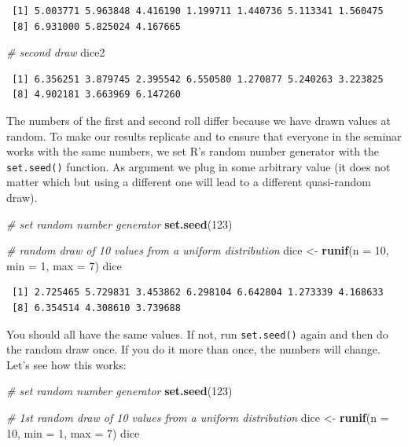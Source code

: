 \documentclass[]{article}
\newenvironment{Shaded}{\begin{snugshade}}{\end{snugshade}}
\newcommand{\CommentTok}[1]{\textcolor[rgb]{0.56,0.35,0.01}{\textit{#1}}}
\newcommand{\DataTypeTok}[1]{\textcolor[rgb]{0.13,0.29,0.53}{#1}}
\newcommand{\DecValTok}[1]{\textcolor[rgb]{0.00,0.00,0.81}{#1}}
\newcommand{\KeywordTok}[1]{\textcolor[rgb]{0.13,0.29,0.53}{\textbf{#1}}}
\newcommand{\NormalTok}[1]{#1}
\newcommand{\StringTok}[1]{\textcolor[rgb]{0.31,0.60,0.02}{#1}}
\begin{document}
\begin{verbatim}
 [1] 5.003771 5.963848 4.416190 1.199711 1.440736 5.113341 1.560475
 [8] 6.931000 5.825024 4.167665
\end{verbatim}

\begin{Shaded}
\begin{Highlighting}[]
\CommentTok{# second draw}
\NormalTok{dice2}
\end{Highlighting}
\end{Shaded}

\begin{verbatim}
 [1] 6.356251 3.879745 2.395542 6.550580 1.270877 5.240263 3.223825
 [8] 4.902181 3.663969 6.147260
\end{verbatim}

The numbers of the first and second roll differ because we have drawn values at random. To make our results replicate and to ensure that everyone in the seminar works with the same numbers, we set R's random number generator with the \texttt{set.seed()} function. As argument we plug in some arbitrary value (it does not matter which but using a different one will lead to a different quasi-random draw).

\begin{Shaded}
\begin{Highlighting}[]
\CommentTok{# set random number generator}
\KeywordTok{set.seed}\NormalTok{(}\DecValTok{123}\NormalTok{)}

\CommentTok{# random draw of 10 values from a uniform distribution}
\NormalTok{dice <-}\StringTok{ }\KeywordTok{runif}\NormalTok{(}\DataTypeTok{n =} \DecValTok{10}\NormalTok{, }\DataTypeTok{min =} \DecValTok{1}\NormalTok{, }\DataTypeTok{max =} \DecValTok{7}\NormalTok{)}
\NormalTok{dice}
\end{Highlighting}
\end{Shaded}

\begin{verbatim}
 [1] 2.725465 5.729831 3.453862 6.298104 6.642804 1.273339 4.168633
 [8] 6.354514 4.308610 3.739688
\end{verbatim}

You should all have the same values. If not, run \texttt{set.seed()} again and then do the random draw once. If you do it more than once, the numbers will change. Let's see how this works:

\begin{Shaded}
\begin{Highlighting}[]
\CommentTok{# set random number generator}
\KeywordTok{set.seed}\NormalTok{(}\DecValTok{123}\NormalTok{)}

\CommentTok{# 1st random draw of 10 values from a uniform distribution}
\NormalTok{dice <-}\StringTok{ }\KeywordTok{runif}\NormalTok{(}\DataTypeTok{n =} \DecValTok{10}\NormalTok{, }\DataTypeTok{min =} \DecValTok{1}\NormalTok{, }\DataTypeTok{max =} \DecValTok{7}\NormalTok{)}
\NormalTok{dice}
\end{Highlighting}
\end{Shaded}
\end{document}
